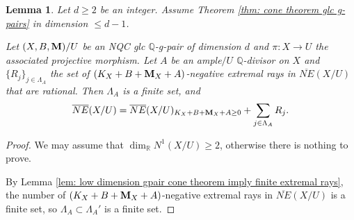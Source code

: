 \documentclass[11pt]{amsart}
\numberwithin{equation}{section}
\newcommand{\Mm}{{\bf{M}}}
\newcommand{\Qq}{\mathbb{Q}}
\newcommand{\Rr}{\mathbb{R}}
\newtheorem{lem}[thm]{Lemma}
\theoremstyle{definition}
\theoremstyle{definition}
\theoremstyle{definition}
\begin{document}
\begin{lem}\label{lem: gpair cone theorem spanned by extremal rays rational case}
Let $d\geq 2$ be an integer. Assume Theorem \ref{thm: cone theorem glc g-pairs} in dimension $\leq d-1$.

Let $(X,B,\Mm)/U$ be an NQC glc $\Qq$-g-pair of dimension $d$ and $\pi: X\rightarrow U$ the associated projective morphism. Let $A$ be an ample$/U$ $\Qq$-divisor on $X$ and $\{R_j\}_{j\in\Lambda_A}$ the set of $(K_X+B+\Mm_X+A)$-negative extremal rays in $\overline{NE}(X/U)$ that are rational. Then $\Lambda_A$ is a finite set, and
$$\overline{NE}(X/U)=\overline{NE}(X/U)_{K_X+B+\Mm_X+A\geq 0}+\sum_{j\in\Lambda_A}R_j.$$
\end{lem}
\begin{proof}
We may assume that $\dim_{\Rr}N^1(X/U)\geq 2$, otherwise there is nothing to prove.

By Lemma \ref{lem: low dimension gpair cone theorem imply finite extremal rays}, the number of $(K_X+B+\Mm_X+A)$-negative extremal rays in $\overline{NE}(X/U)$ is a finite set, so $\Lambda_A\subset\Lambda_A'$ is a finite set.


\end{proof}
\end{document}
